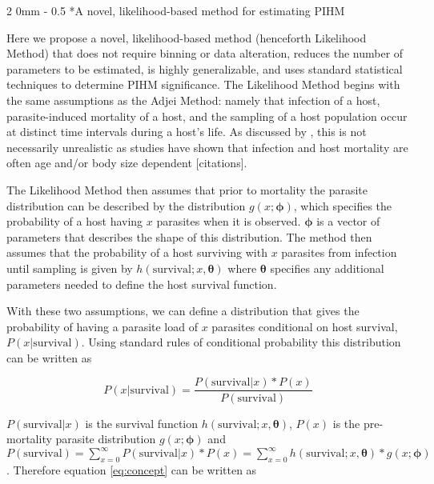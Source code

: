 \documentclass[12pt, a4paper]{article}
\makeatletter
\renewcommand{\subsection}{\@startsection
{subsection}%
{2}%
{0mm}%
{-\baselineskip}%
{0.5\baselineskip}%
{\normalfont\bf}} %
\makeatother
\begin{document}
\subsection*{A novel, likelihood-based method for estimating PIHM}

Here we propose a novel, likelihood-based method (henceforth Likelihood Method)
that does not require binning or data alteration, reduces the number of
parameters to be estimated, is highly generalizable, and uses standard
statistical techniques to determine PIHM significance.  The Likelihood Method
begins with the same assumptions as the Adjei Method: namely that infection of
a host, parasite-induced mortality of a host, and the sampling of a host
population occur at distinct time intervals during a host's life. As discussed by
\citeauthor{Adjei1986}, this is not necessarily unrealistic as studies have
shown that infection and host mortality are often age and/or body size dependent [citations].

The Likelihood Method then assumes that prior to mortality the parasite distribution can be described by the distribution $g(x; \boldsymbol{\phi})$, which specifies the probability of a host having $x$ parasites when it is observed.  $\boldsymbol{\phi}$ is a vector of parameters that describes the shape of this distribution. The method then assumes that the probability of a host surviving with $x$ parasites from infection until sampling is given by $h(\text{survival} ; x, \boldsymbol{\theta})$ where $\boldsymbol{\theta}$ specifies any additional parameters needed to define the host survival function.

With these two assumptions, we can define a distribution that gives the probability of having a parasite load of $x$ parasites conditional on host survival, $P(x | \text{survival})$.  Using standard rules of conditional probability this distribution can be written as

\begin{equation}
    P(x | \text{survival}) = \dfrac{P(\text{survival} | x) * P(x)}{P(\text{survival})}
    \label{eq:concept}
\end{equation}

$P(\text{survival} | x)$ is the survival function $h(\text{survival}; x, \boldsymbol{\theta})$, $P(x)$ is the pre-mortality parasite distribution $g(x; \boldsymbol{\phi})$ and $P(\text{survival}) = \sum_{x=0}^{\infty} P(\text{survival} | x) * P(x) =  \sum_{x=0}^{\infty} h(\text{survival}; x, \boldsymbol{\theta})  * g(x; \boldsymbol{\phi})$. Therefore equation \ref{eq:concept} can be written as
\end{document}
